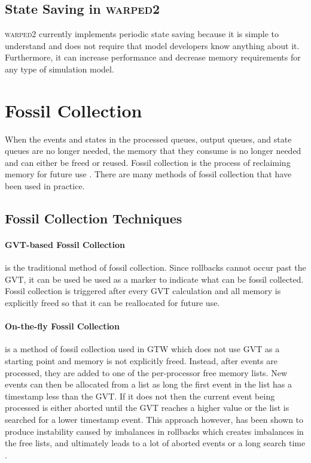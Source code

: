 \documentclass[11pt]{book}
\begin{document}
\subsection{State Saving in \textsc{warped2}}

\textsc{warped2} currently implements periodic state saving because it is simple to understand and
does not require that model developers know anything about it.  Furthermore, it can increase
performance and decrease memory requirements for any type of simulation model.

\section{Fossil Collection}

When the events and states in the processed queues, output queues, and state queues are no longer
needed, the memory that they consume is no longer needed and can either be freed or reused.  Fossil
collection is the process of reclaiming memory for future use \cite{fujimoto-90,fujimoto-00}.  There
are many methods of fossil collection that have been used in practice.

\subsection{Fossil Collection Techniques}

\paragraph{GVT-based Fossil Collection} is the traditional method of fossil collection.  Since
rollbacks cannot occur past the GVT, it can be used be used as a marker to indicate what can be
fossil collected.  Fossil collection is triggered after every GVT calculation and all memory is
explicitly freed so that it can be reallocated for future use.


\paragraph{On-the-fly Fossil Collection} is a method of fossil collection used in GTW which does not
use GVT as a starting point and memory is not explicitly freed.  Instead, after events are
processed, they are added to one of the per-processor free memory lists.  New events can then be
allocated from a list as long the first event in the list has a timestamp less than the GVT.  If it
does not then the current event being processed is either aborted until the GVT reaches a higher
value or the list is searched for a lower timestamp event.  This approach however, has been shown to
produce instability caused by imbalances in rollbacks which creates imbalances in the free lists,
and ultimately leads to a lot of aborted events or a long search time \cite{}.
\end{document}
